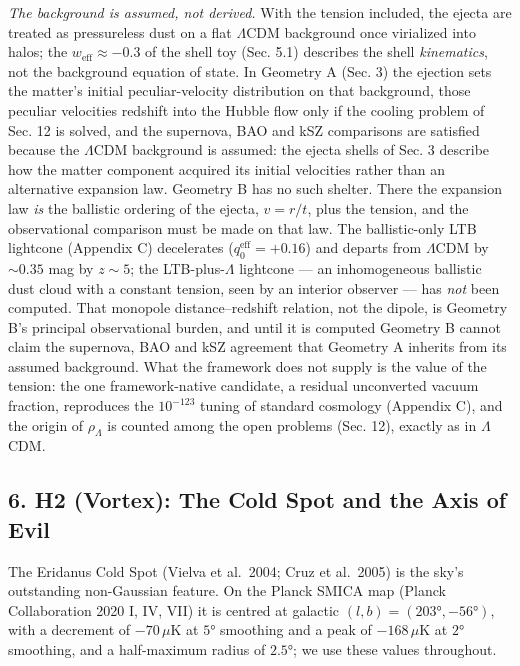 \documentclass[
]{article}
\begin{document}
\emph{The background is assumed, not derived.} With the tension
included, the ejecta are treated as pressureless dust on a flat
\(\Lambda\)CDM background once virialized into halos; the
\(w_{\text{eff}} \approx -0.3\) of the shell toy (Sec. 5.1) describes
the shell \emph{kinematics}, not the background equation of state. In
Geometry A (Sec. 3) the ejection sets the matter's initial
peculiar-velocity distribution on that background, those peculiar
velocities redshift into the Hubble flow only if the cooling problem of
Sec. 12 is solved, and the supernova, BAO and kSZ comparisons are
satisfied because the \(\Lambda\)CDM background is assumed: the ejecta
shells of Sec. 3 describe how the matter component acquired its initial
velocities rather than an alternative expansion law. Geometry B has no
such shelter. There the expansion law \emph{is} the ballistic ordering
of the ejecta, \(v = r/t\), plus the tension, and the observational
comparison must be made on that law. The ballistic-only LTB lightcone
(Appendix C) decelerates (\(q_0^{\text{eff}} = +0.16\)) and departs from
\(\Lambda\)CDM by \(\sim\!0.35\) mag by \(z \sim 5\); the
LTB-plus-\(\Lambda\) lightcone --- an inhomogeneous ballistic dust cloud
with a constant tension, seen by an interior observer --- has \emph{not}
been computed. That monopole distance--redshift relation, not the
dipole, is Geometry B's principal observational burden, and until it is
computed Geometry B cannot claim the supernova, BAO and kSZ agreement
that Geometry A inherits from its assumed background. What the framework
does not supply is the value of the tension: the one framework-native
candidate, a residual unconverted vacuum fraction, reproduces the
\(10^{-123}\) tuning of standard cosmology (Appendix C), and the origin
of \(\rho_\Lambda\) is counted among the open problems (Sec. 12),
exactly as in \(\Lambda\)CDM.

\hypertarget{h2-vortex-the-cold-spot-and-the-axis-of-evil}{%
\subsection{\texorpdfstring{\textbf{6. H2 (Vortex): The Cold Spot and
the Axis of
Evil}}{6. H2 (Vortex): The Cold Spot and the Axis of Evil}}\label{h2-vortex-the-cold-spot-and-the-axis-of-evil}}

The Eridanus Cold Spot (Vielva et al.~2004; Cruz et al.~2005) is the
sky's outstanding non-Gaussian feature. On the Planck SMICA map (Planck
Collaboration 2020 I, IV, VII) it is centred at galactic
\((l, b) = (203°, -56°)\), with a decrement of \(-70\,\mu\)K at \(5°\)
smoothing and a peak of \(-168\,\mu\)K at \(2°\) smoothing, and a
half-maximum radius of \(2.5°\); we use these values throughout.
\end{document}
